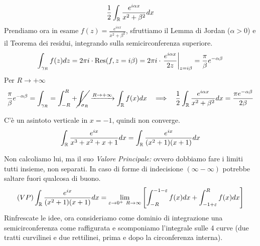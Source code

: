 \begin{equation*}
\frac{1}{2}\int_{\mathbb{R}}\frac{e^{i\alpha x}}{x^{2} + \beta^{2}} dx
\end{equation*}Prendiamo ora in esame $f(z) = \frac{e^{i\alpha x}}{x^{2} + \beta^{2}}$, sfruttiamo il Lemma di Jordan ($\alpha > 0$) e il Teorema dei residui, integrando sulla semicirconferenza superiore.
\begin{equation*}
\int_{\gamma_{R}} f(z) dz = 2\pi i \cdot \operatorname{Res} (f, z = i\beta) = 2\pi i \cdot \left. \frac{e^{i\alpha x}}{2z}\right|_{z = i\beta} = \frac{\pi}{\beta} e^{- \alpha \beta}
\end{equation*}
Per $R\rightarrow + \infty $
\begin{equation*}
\frac{\pi}{\beta} e^{- \alpha \beta} = \int_{\gamma_{R}} = \int^{R}_{- R} + \cancel{\int_{\sigma_{R}}}\xrightarrow{R\rightarrow + \infty}\int_{\mathbb{R}} f(x) dx\ \ \implies \ \ \frac{1}{2}\int_{\mathbb{R}}\frac{e^{i\alpha x}}{x^{2} + \beta^{2}} dx = \frac{\pi e^{- \alpha \beta}}{2\beta}
\end{equation*}
\Soluzione

C'è un asintoto verticale in $x = -1$, quindi non converge.
\begin{equation*}
\int_{\mathbb{R}}\frac{e^{ix}}{x^{3} + x^{2} + x + 1} dx = \int_{\mathbb{R}}\frac{e^{ix}}{(x^{2} + 1)(x + 1)} dx
\end{equation*}

Non calcoliamo lui, ma il suo \textit{Valore Principale:} ovvero dobbiamo fare i limiti tutti insieme, non separati. In caso di forme di indecisione $(\infty - \infty)$ potrebbe saltare fuori qualcosa di buono.
\begin{equation*}
(VP)\int_{\mathbb{R}}\frac{e^{ix}}{(x^{2} + 1)(x + 1)} dx = \lim_{\varepsilon \rightarrow 0^{+} \ R\rightarrow \infty}\left[\int^{- 1 - \varepsilon}_{- R} f(x)dx + \int^{R}_{- 1 + \varepsilon} f(x)dx\right]
\end{equation*}
Rinfrescate le idee, ora consideriamo come dominio di integrazione una semicirconferenza come raffigurata e scomponiamo l'integrale sulle 4 curve (due tratti curvilinei e due rettilinei, prima e dopo la circonferenza interna).


